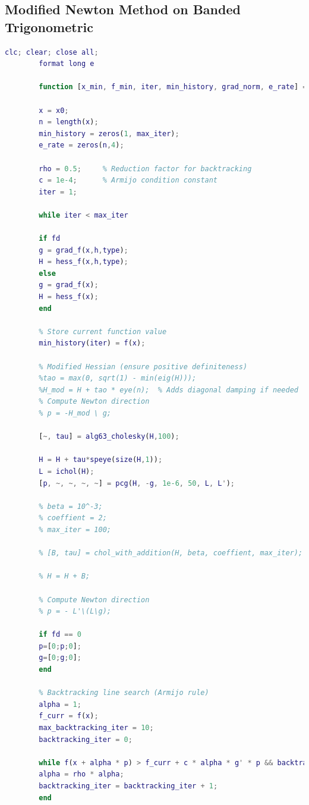 \documentclass[a4paper,12pt]{article}
\begin{document}
	\subsection*{Modified Newton Method on Banded Trigonometric}
	\begin{lstlisting}[language=Matlab,caption={Full script: Modified Newton method on Banded Trigonometric},label={lst:rosenbrock-extended}]
		clc; clear; close all;
		format long e
		
		function [x_min, f_min, iter, min_history, grad_norm, e_rate] = modified_newton(f,grad_f,hess_f,x0,tol,max_iter,fd,h,type)
		
		x = x0;
		n = length(x);
		min_history = zeros(1, max_iter);
		e_rate = zeros(n,4);
		
		rho = 0.5;     % Reduction factor for backtracking
		c = 1e-4;      % Armijo condition constant
		iter = 1;
		
		while iter < max_iter
		
		if fd 
		g = grad_f(x,h,type);
		H = hess_f(x,h,type);
		else  
		g = grad_f(x);
		H = hess_f(x);
		end
		
		% Store current function value
		min_history(iter) = f(x); 
		
		% Modified Hessian (ensure positive definiteness)
		%tao = max(0, sqrt(1) - min(eig(H)));
		%H_mod = H + tao * eye(n);  % Adds diagonal damping if needed
		% Compute Newton direction
		% p = -H_mod \ g;
		
		[~, tau] = alg63_cholesky(H,100);
		
		H = H + tau*speye(size(H,1));
		L = ichol(H);
		[p, ~, ~, ~, ~] = pcg(H, -g, 1e-6, 50, L, L');
		
		% beta = 10^-3;
		% coeffient = 2;
		% max_iter = 100;
		
		% [B, tau] = chol_with_addition(H, beta, coeffient, max_iter);
		
		% H = H + B;
		
		% Compute Newton direction
		% p = - L'\(L\g);
		
		if fd == 0
		p=[0;p;0];
		g=[0;g;0];
		end
		
		% Backtracking line search (Armijo rule)
		alpha = 1;
		f_curr = f(x);
		max_backtracking_iter = 10; 
		backtracking_iter = 0;
		
		while f(x + alpha * p) > f_curr + c * alpha * g' * p && backtracking_iter < max_backtracking_iter
		alpha = rho * alpha;
		backtracking_iter = backtracking_iter + 1;
		end
		

\end{lstlisting}
\end{document}
